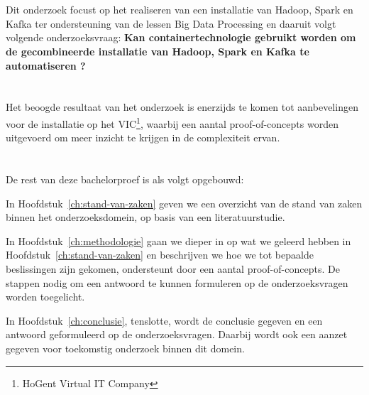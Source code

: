 \section{}%
\label{sec:onderzoeksvraag}
Dit onderzoek focust op het realiseren van een installatie van Hadoop, Spark en Kafka ter ondersteuning van de lessen Big Data Processing en daaruit volgt volgende onderzoeksvraag:
\textbf{Kan containertechnologie gebruikt worden om de gecombineerde installatie van Hadoop, Spark en Kafka te automatiseren ?}

\section{}%
\label{sec:onderzoeksdoelstelling}

Het beoogde resultaat van het onderzoek is enerzijds te komen tot aanbevelingen voor de installatie op het VIC\footnote{HoGent Virtual IT Company}, waarbij een aantal proof-of-concepts worden uitgevoerd om meer inzicht te krijgen in de complexiteit ervan.

\section{}%
\label{sec:opzet-bachelorproef}

De rest van deze bachelorproef is als volgt opgebouwd:

In Hoofdstuk~\ref{ch:stand-van-zaken} geven we een overzicht van de stand van zaken binnen het onderzoeksdomein, op basis van een literatuurstudie.

In Hoofdstuk~\ref{ch:methodologie} gaan we dieper in op wat we geleerd hebben in Hoofdstuk~\ref{ch:stand-van-zaken} en beschrijven we hoe we tot bepaalde beslissingen zijn gekomen, ondersteunt door een aantal proof-of-concepts. De stappen nodig om een antwoord te kunnen formuleren op de onderzoeksvragen worden toegelicht.


In Hoofdstuk~\ref{ch:conclusie}, tenslotte, wordt de conclusie gegeven en een antwoord geformuleerd op de onderzoeksvragen. Daarbij wordt ook een aanzet gegeven voor toekomstig onderzoek binnen dit domein.
